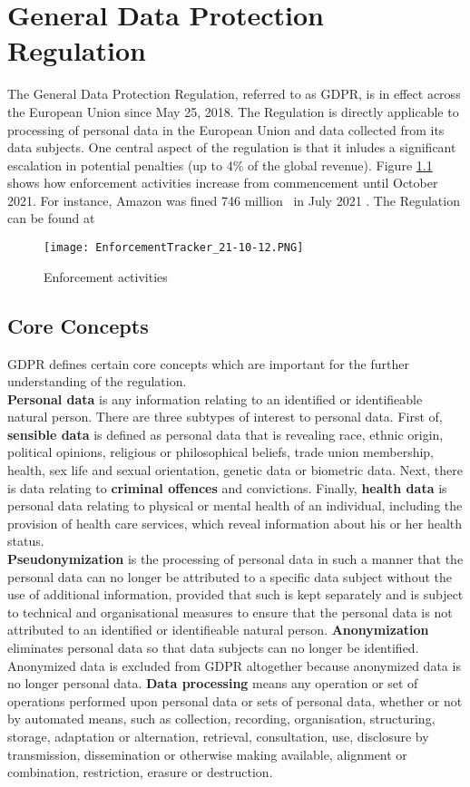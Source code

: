 \documentclass[a4paper,12pt]{report}
\begin{document}
	\chapter{General Data Protection Regulation}  \label{GDPR}
	The General Data Protection Regulation, referred to as GDPR, is in effect across the European Union since May 25, 2018.
	The Regulation is directly applicable to processing of personal data in the European Union and data collected from its data subjects.
	One central aspect of the regulation is that it inludes a significant escalation in potential penalties (up to 4\% of the global revenue).
	Figure \ref{fig:enforcement_tracker} shows how enforcement activities increase from commencement until October 2021.
	For instance, Amazon was fined 746 million \texteuro \ in July 2021 \cite{EnforcementTracker}.
	The Regulation can be found at \cite{EUdataregulations2018}
	\begin{figure}
		\centering
		\texttt{[image: EnforcementTracker\_21-10-12.PNG]}
		\caption{Enforcement activities \cite{EnforcementTracker}}
		\label{fig:enforcement_tracker}
	\end{figure}
	
	\section{Core Concepts}
	\startsection
	GDPR defines certain core concepts which are important for the further understanding of the regulation.\\
	\textbf{Personal data} is any information relating to an identified or identifieable natural person.
	There are three subtypes of interest to personal data. 
	First of, \textbf{sensible data} is defined as personal data that is revealing race, ethnic origin, political opinions, religious or philosophical beliefs, trade union membership, health, sex life and sexual orientation, genetic data or biometric data.
	Next, there is data relating to \textbf{criminal offences} and convictions.
	Finally, \textbf{health data} is personal data relating to physical or mental health of an individual, including the provision of health care services, which reveal information about his or her health status.\\
	\textbf{Pseudonymization} is the processing of personal data in such a manner that the personal data can no longer be attributed to a specific data subject without the use of additional information, provided that such is kept separately and is subject to technical and organisational measures to ensure that the personal data is not attributed to an identified or identifieable natural person.
	\textbf{Anonymization} eliminates personal data so that data subjects can no longer be identified. 
	Anonymized data is excluded from GDPR altogether because anonymized data is no longer personal data.
	\textbf{Data processing} means any operation or set of operations performed upon personal data or sets of personal data, whether or not by automated means, such as collection, recording, organisation, structuring, storage, adaptation or alternation, retrieval, consultation, use, disclosure by transmission, dissemination or otherwise making available, alignment or combination, restriction, erasure or destruction.
	\closesection
\end{document}
